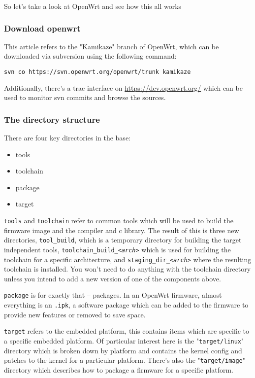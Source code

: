 So let's take a look at OpenWrt and see how this all works


\subsubsection{Download openwrt}

This article refers to the "Kamikaze" branch of OpenWrt, which can be downloaded via
subversion using the following command:

\begin{Verbatim}
svn co https://svn.openwrt.org/openwrt/trunk kamikaze
\end{Verbatim}

Additionally, there's a trac interface on \href{https://dev.openwrt.org/}{https://dev.openwrt.org/}
which can be used to monitor svn commits and browse the sources.


\subsubsection{The directory structure}

There are four key directories in the base:

\begin{itemize}
	\item tools
	\item toolchain
	\item package
	\item target
\end{itemize}

\texttt{tools} and \texttt{toolchain} refer to common tools which will be
used to build the firmware image and the compiler and c library. 
The result of this is three new directories, \texttt{tool\_build}, which is a temporary
directory for building the target independent tools, \texttt{toolchain\_build\_\textit{<arch>}}
which is used for building the toolchain for a specific architecture, and
\texttt{staging\_dir\_\textit{<arch>}} where the resulting toolchain is installed.
You won't need to do anything with the toolchain directory unless you intend to
add a new version of one of the components above.

\texttt{package} is for exactly that -- packages. In an OpenWrt firmware, almost everything 
is an \texttt{.ipk}, a software package which can be added to the firmware to provide new
features or removed to save space.

\texttt{target} refers to the embedded platform, this contains items which are specific to
a specific embedded platform. Of particular interest here is the "\texttt{target/linux}" 
directory which is broken down by platform and contains the kernel config and patches 
to the kernel for a particular platform. There's also the "\texttt{target/image}" directory
which describes how to package a firmware for a specific platform.


